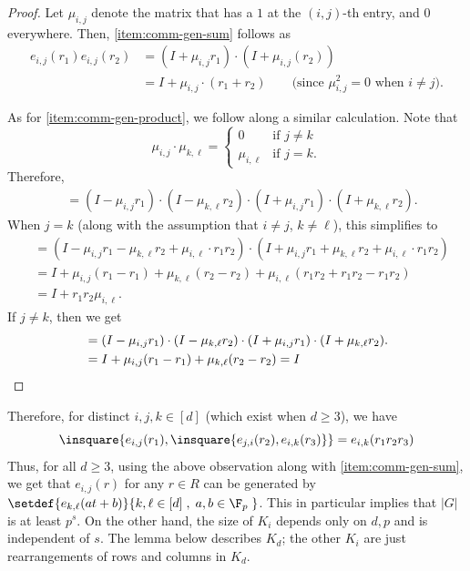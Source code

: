 \documentclass{toc}
\begin{document}
\begin{proof}
  Let $\mu_{i,j}$ denote the matrix that has a $1$ at the $(i,j)$-th entry, and $0$ everywhere. Then, \eqref{item:comm-gen-sum} follows as
  \begin{align*}
    e_{i,j}(r_1) e_{i,j}(r_2) &= (I + \mu_{i,j} r_1) \cdot (I + \mu_{i,j}(r_2))\\
    & = I + \mu_{i,j} \cdot (r_1 + r_2)\qquad\text{(since $\mu_{i,j}^2 = 0$ when $i\neq j$)}.
  \end{align*}

  As for \eqref{item:comm-gen-product}, we follow along a similar calculation. Note that 
  \[
  \mu_{i,j} \cdot \mu_{k,\ell} = \begin{cases} 0 & \text{if $j\neq k$}\\ \mu_{i,\ell} & \text{if $j = k$}.\end{cases}
  \]
  Therefore, 
  \begin{align*}
    [e_{i,j}(r_1), e_{k,\ell}(r_2)] & = (I - \mu_{i,j} r_1)\cdot (I - \mu_{k,\ell}r_2) \cdot (I + \mu_{i,j} r_1)\cdot (I + \mu_{k,\ell}r_2).
  \end{align*}
  When $j = k$ (along with the assumption that $i\neq j$, $k\neq \ell$), this simplifies to
  \begin{align*}
    [e_{i,j}(r_1), e_{k,\ell}(r_2)] &= (I - \mu_{i,j}r_1 - \mu_{k,\ell}r_2 + \mu_{i,\ell} \cdot r_1r_2) \cdot (I + \mu_{i,j}r_1 + \mu_{k,\ell}r_2 + \mu_{i,\ell} \cdot r_1r_2)\\
    & = I + \mu_{i,j}(r_1 - r_1) + \mu_{k,\ell}(r_2 - r_2) + \mu_{i,\ell}(r_1r_2 + r_1r_2 - r_1r_2)\\
    & = I + r_1r_2 \mu_{i,\ell}.
  \end{align*}
  If $j \neq k$, then we get
  \begin{align*}
  [e_{i,j}(r_1), e_{k,\ell}(r_2)] & = (I - \mu_{i,j} r_1)\cdot (I - \mu_{k,\ell}r_2) \cdot (I + \mu_{i,j} r_1)\cdot (I + \mu_{k,\ell}r_2).\\
  & = I + \mu_{i,j}(r_1 - r_1) + \mu_{k,\ell}(r_2 - r_2) = I\qedhere
  \end{align*}
\end{proof}

\noindent 
Therefore, for distinct $i,j,k \in [d]$ (which exist when $d\geq 3$), we have
\[
  \insquare{e_{i,j}(r_1), \insquare{e_{j,i}(r_2), e_{i,k}(r_3)}} = e_{i,k}(r_1r_2r_3)
\]
Thus, for all $d \geq 3$, using the above observation along with \eqref{item:comm-gen-sum}, we get that $e_{i,j}(r)$ for any $r\in R$ can be generated by $\setdef{e_{k,\ell}(at + b)}{k,\ell \in [d]\;,\; a,b\in \F_p\;}$. 
This in particular implies that $|G|$ is at least $p^s$.
On the other hand, the size of $K_i$ depends only on $d,p$ and is independent of $s$.
The lemma below describes $K_d$; the other %
$K_i$  %
are just rearrangements of rows and columns in $K_d$.
\end{document}
